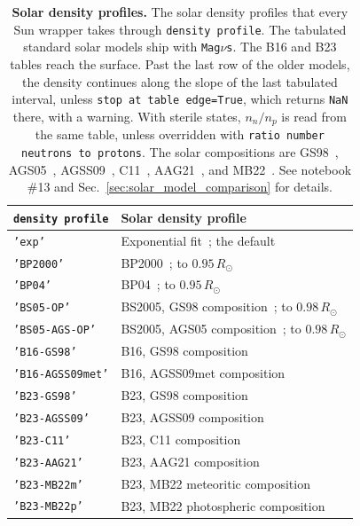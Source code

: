 \documentclass[final,5p,times,twocolumn,sort,compress]{elsarticle}
\makeatletter
\DeclareRobustCommand{\_}{%
  \ifmmode\nfss@text{\textunderscore}\else\textunderscore\allowbreak\fi}
\newcommand{\magnus}{{\tt Mag}\ensuremath{\nu}{\tt s}}
\makeatother
\begin{document}
{\def\arraystretch{1.2}
\begin{table}[t!]
 {\small
 \begin{tabular}{@{}lp{5.9cm}@{}}
 {\tt density\_profile} & Solar density profile \\
 \hline
 {\tt 'exp'} & Exponential fit~\cite{Giunti:2007ry}; the default \\
 {\tt 'BP2000'} & BP2000~\cite{Bahcall:2000nu}; to $0.95\,R_\odot$ \\
 {\tt 'BP04'} & BP04~\cite{Bahcall:2004fg}; to $0.95\,R_\odot$ \\
 {\tt 'BS05-OP'} & BS2005, GS98 composition~\cite{Bahcall:2004pz}; to $0.98\,R_\odot$ \\
 {\tt 'BS05-AGS-OP'} & BS2005, AGS05 composition~\cite{Bahcall:2004pz}; to $0.98\,R_\odot$ \\
 {\tt 'B16-GS98'} & B16, GS98 composition~\cite{Vinyoles:2016djt} \\
 {\tt 'B16-AGSS09met'} & B16, AGSS09met composition~\cite{Vinyoles:2016djt} \\
 {\tt 'B23-GS98'} & B23, GS98 composition~\cite{Herrera:2023b23} \\
 {\tt 'B23-AGSS09'} & B23, AGSS09 composition~\cite{Herrera:2023b23} \\
 {\tt 'B23-C11'} & B23, C11 composition~\cite{Herrera:2023b23} \\
 {\tt 'B23-AAG21'} & B23, AAG21 composition~\cite{Herrera:2023b23} \\
 {\tt 'B23-MB22m'} & B23, MB22 meteoritic composition~\cite{Herrera:2023b23} \\
 {\tt 'B23-MB22p'} & B23, MB22 photospheric composition~\cite{Herrera:2023b23} \\
 \end{tabular}}
 \caption{\label{tab:solar_models}\textbf{Solar density profiles.} The solar density profiles that every Sun wrapper takes through {\tt density\_profile}. The tabulated standard solar models ship with \magnus. The B16 and B23 tables reach the surface. Past the last row of the older models, the density continues along the slope of the last tabulated interval, unless {\tt stop\_at\_table\_edge=True}, which returns {\tt NaN} there, with a warning. With sterile states, $n_n/n_p$ is read from the same table, unless overridden with {\tt ratio\_number\_neutrons\_to\_protons}. The solar compositions are GS98~\cite{Grevesse:1998bj}, AGS05~\cite{Asplund:2004eu}, AGSS09~\cite{Asplund:2009fu}, C11~\cite{Caffau:2010qc}, AAG21~\cite{Asplund:2021aag}, and MB22~\cite{Magg:2022rxb}. See notebook \#13 and Sec.~\ref{sec:solar_model_comparison} for details.}
\end{table}}
\end{document}
